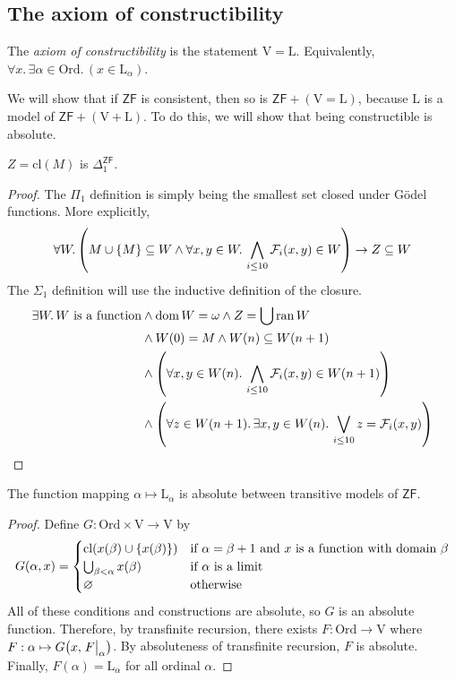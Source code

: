 \subsection{The axiom of constructibility}
\begin{definition}
    The \emph{axiom of constructibility} is the statement \( \mathrm{V} = \mathrm{L} \).
    Equivalently, \( \forall x.\, \exists \alpha \in \mathrm{Ord}.\, (x \in \mathrm{L}_\alpha) \).
\end{definition}
We will show that if \( \mathsf{ZF} \) is consistent, then so is \( \mathsf{ZF} + (\mathrm{V} = \mathrm{L}) \), because \( \mathrm{L} \) is a model of \( \mathsf{ZF} + (\mathrm{V} + \mathrm{L}) \).
To do this, we will show that being constructible is absolute.
\begin{lemma}
    \( Z = \mathrm{cl}(M) \) is \( \Delta_1^{\mathsf{ZF}} \).
\end{lemma}
\begin{proof}
    The \( \Pi_1 \) definition is simply being the smallest set closed under G\"odel functions.
    More explicitly,
    \[ \forall W.\, \qty(M \cup \qty{M} \subseteq W \wedge \forall x, y \in W.\, \bigwedge_{i \leq 10} \mathcal F_i(x, y) \in W) \to Z \subseteq W \]
    The \( \Sigma_1 \) definition will use the inductive definition of the closure.
    \begin{align*}
        \exists W.\, W \text{ is a function} &\wedge \operatorname{dom} W = \omega \wedge Z = \bigcup \operatorname{ran} W \\
        &\wedge W(0) = M \wedge W(n) \subseteq W(n+1) \\
        &\wedge \qty(\forall x, y \in W(n).\, \bigwedge_{i \leq 10} \mathcal F_i(x, y) \in W(n+1)) \\
        &\wedge \qty(\forall z \in W(n+1).\, \exists x, y \in W(n).\, \bigvee_{i \leq 10} z = \mathcal F_i(x, y))
    \end{align*}
\end{proof}
\begin{lemma}
    The function mapping \( \alpha \mapsto \mathrm{L}_\alpha \) is absolute between transitive models of \( \mathsf{ZF} \).
\end{lemma}
\begin{proof}
    Define \( G : \mathrm{Ord} \times \mathrm{V} \to \mathrm{V} \) by
    \[ G(\alpha, x) = \begin{cases}
        \mathrm{cl}(x(\beta) \cup \qty{x(\beta)}) & \text{if } \alpha = \beta + 1 \text{ and } x \text{ is a function with domain } \beta \\
        \bigcup_{\beta < \alpha} x(\beta) & \text{if } \alpha \text{ is a limit} \\
        \varnothing & \text{otherwise}
    \end{cases} \]
    All of these conditions and constructions are absolute, so \( G \) is an absolute function.
    Therefore, by transfinite recursion, there exists \( F : \mathrm{Ord} \to \mathrm{V} \) where \( F : \alpha \mapsto G\qty(x, \eval{F}_\alpha) \).
    By absoluteness of transfinite recursion, \( F \) is absolute.
    Finally, \( F(\alpha) = \mathrm{L}_\alpha \) for all ordinal \( \alpha \).
\end{proof}
